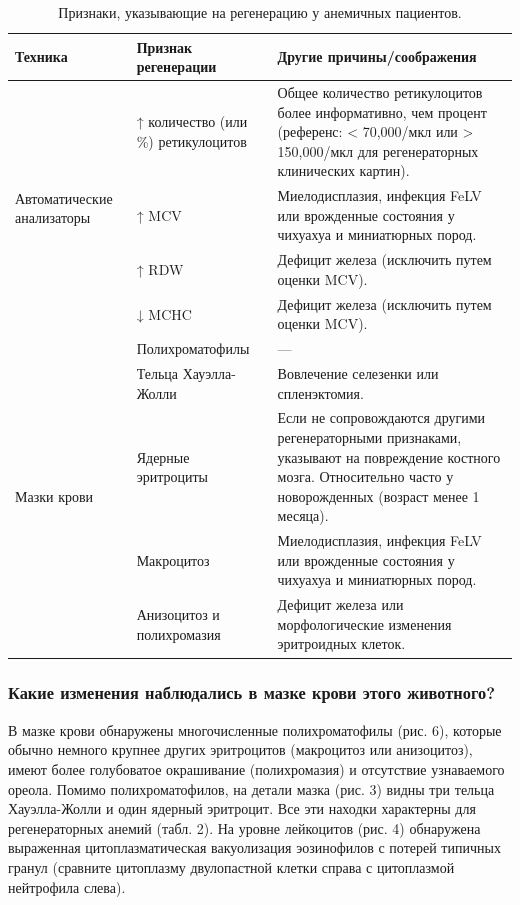 \documentclass[a4paper,12pt]{book}
\begin{document}
\begin{table}[htbp]
\centering
\caption{Признаки, указывающие на регенерацию у анемичных пациентов.}
\begin{tabular}{p{3cm}p{4cm}p{5cm}}
\toprule
Техника & Признак регенерации & Другие причины/соображения \\
\midrule
\multirow{4}{*}{Автоматические анализаторы} & ↑ количество (или \%) ретикулоцитов & Общее количество ретикулоцитов более информативно, чем процент (референс: < 70,000/мкл или > 150,000/мкл для регенераторных клинических картин). \\
& ↑ MCV & Миелодисплазия, инфекция FeLV или врожденные состояния у чихуахуа и миниатюрных пород. \\
& ↑ RDW & Дефицит железа (исключить путем оценки MCV). \\
& ↓ MCHC & Дефицит железа (исключить путем оценки MCV). \\
\multirow{5}{*}{Мазки крови} & Полихроматофилы & --- \\
& Тельца Хауэлла-Жолли & Вовлечение селезенки или спленэктомия. \\
& Ядерные эритроциты & Если не сопровождаются другими регенераторными признаками, указывают на повреждение костного мозга. Относительно часто у новорожденных (возраст менее 1 месяца). \\
& Макроцитоз & Миелодисплазия, инфекция FeLV или врожденные состояния у чихуахуа и миниатюрных пород. \\
& Анизоцитоз и полихромазия & Дефицит железа или морфологические изменения эритроидных клеток. \\
\bottomrule
\end{tabular}
\end{table}

\subsubsection*{Какие изменения наблюдались в мазке крови этого животного?}
В мазке крови обнаружены многочисленные полихроматофилы (рис. 6), которые обычно немного крупнее других эритроцитов (макроцитоз или анизоцитоз), имеют более голубоватое окрашивание (полихромазия) и отсутствие узнаваемого ореола. Помимо полихроматофилов, на детали мазка (рис. 3) видны три тельца Хауэлла-Жолли и один ядерный эритроцит. Все эти находки характерны для регенераторных анемий (табл. 2). На уровне лейкоцитов (рис. 4) обнаружена выраженная цитоплазматическая вакуолизация эозинофилов с потерей типичных гранул (сравните цитоплазму двулопастной клетки справа с цитоплазмой нейтрофила слева).
\end{document}
